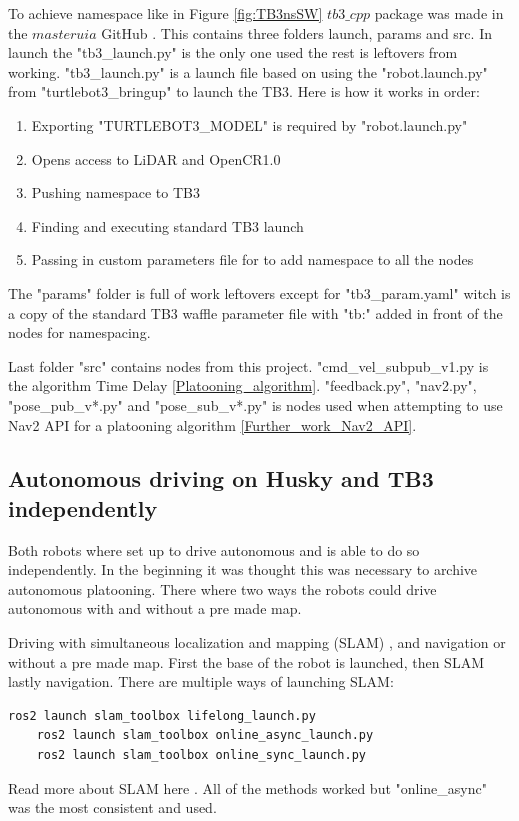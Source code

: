 \label{method::tb3_cpp_pkg_explained}To achieve namespace like in Figure \ref{fig:TB3nsSW} $tb3\_cpp$ package was made in the $masteruia$ GitHub \cite{masteruia}. This contains three folders launch, params and src. In launch the "tb3\_launch.py" is the only one used the rest is leftovers from working. "tb3\_launch.py" is  a launch file based on using the "robot.launch.py" from "turtlebot3\_bringup" \cite{turtlebot3galactic} to launch the TB3. Here is how it works in order: 
\begin{enumerate}
\item Exporting "TURTLEBOT3\_MODEL" is required by "robot.launch.py" 
\item Opens access to LiDAR and OpenCR1.0 
\item Pushing namespace to TB3 
\item Finding and executing standard TB3 launch
\item Passing in custom parameters file for to add namespace to all the nodes 
\end{enumerate}  

The "params" folder is full of work leftovers except for "tb3\_param.yaml" witch is a copy of the standard TB3 waffle parameter file with "tb:" added in front of the nodes for namespacing.

Last folder "src" contains nodes from this project. "cmd\_vel\_subpub\_v1.py is the algorithm Time Delay \ref{Platooning_algorithm}. "feedback.py", "nav2.py", "pose\_pub\_v*.py" and "pose\_sub\_v*.py" is nodes used when attempting to use Nav2 API for a platooning algorithm \ref{Further_work_Nav2_API}.

\subsection{Autonomous driving on Husky and TB3 independently} \label{Autonomous driving on Husky and TB3 independently}
Both robots where set up to drive autonomous and is able to do so independently. In the beginning it was thought this was necessary to archive autonomous platooning. There where two ways the robots could drive autonomous with and without a pre made map. 

Driving with simultaneous localization and mapping (SLAM) , and navigation or without a pre made map. First the base of the robot is launched, then SLAM lastly navigation. There are multiple ways of launching SLAM: 
\begin{lstlisting}[language=bash]
    ros2 launch slam_toolbox lifelong_launch.py 
    ros2 launch slam_toolbox online_async_launch.py
    ros2 launch slam_toolbox online_sync_launch.py
\end{lstlisting}
Read more about SLAM here \cite{slamtoolboxgithub}. All of the methods worked but "online\_async" was the most consistent and used. 

